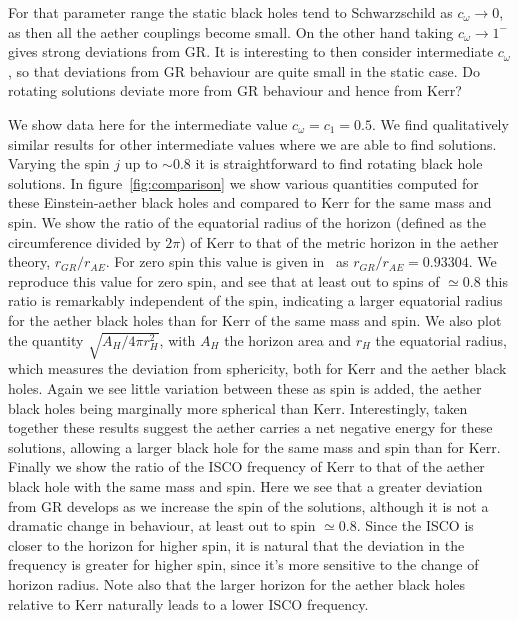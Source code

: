 \documentclass[12pt]{article}
\numberwithin{equation}{section}
\begin{document}
For that parameter range the static black holes tend to Schwarzschild as $c_\omega \to 0$, as then all the aether couplings become small. On the other hand taking $c_\omega \to 1^-$ gives strong deviations from GR.
It is interesting to then consider intermediate $c_\omega$, so that deviations from GR behaviour are quite small in the static case. Do rotating solutions deviate more from GR behaviour and hence from Kerr? 

We show data here for the intermediate value $c_\omega = c_1 = 0.5$. We find qualitatively similar results for other intermediate values where we are able to find solutions. Varying the spin $j$ up to $\sim 0.8$ it is straightforward to find rotating black hole solutions.
In figure~\ref{fig:comparison} we show various quantities computed for these Einstein-aether black holes and compared to Kerr for the same mass and spin. We show the ratio of the equatorial radius of the horizon (defined as the circumference divided by $2\pi$) of Kerr to that of the metric horizon in the aether theory, $r_{GR}/r_{AE}$. For zero spin this value is given in~\cite{Barausse:2011pu} as $r_{GR}/r_{AE} = 0.93304$. We reproduce this value for zero spin, and see that at least out to spins of $\simeq 0.8$ this ratio is remarkably independent of the spin, indicating a larger equatorial radius for the aether black holes than for Kerr of the same mass and spin. 
We also plot the quantity  $\sqrt{A_H/4\pi r_H^2}$, with $A_H$ the horizon area and $r_H$ the equatorial radius, which measures the deviation from sphericity, both for Kerr and the aether black holes. Again we see little variation between these as spin is added, the aether black holes being marginally more spherical than Kerr. 
Interestingly, taken together these results suggest the aether carries a net negative energy for these solutions, allowing a larger black hole for the same mass and spin than for Kerr.
Finally we show the ratio of the ISCO frequency of Kerr to that of the aether black hole with the same mass and spin. Here we see that a greater deviation from GR develops as we increase the spin of the solutions, although it is not a dramatic change in behaviour, at least out to spin $\simeq 0.8$.
Since the ISCO is closer to the horizon for higher spin, it is natural that the deviation in the frequency is greater for higher spin, since it's more sensitive to the change of horizon radius. Note also that the larger horizon for the aether black holes relative to Kerr naturally leads to a lower ISCO frequency.
\end{document}
